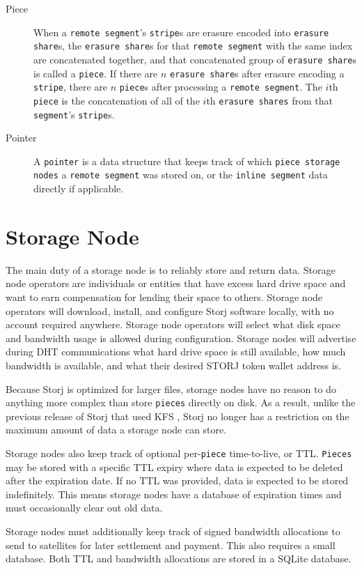 \documentclass[11pt,fleqn,openany]{book}
\newcommand{\x}[1]{{\tt #1}} \newcommand{\code}[1]{{\tt #1}}
\begin{document}
\begin{description}
\item[Piece] When a \x{remote segment}'s \x{stripe}s are erasure encoded into
\x{erasure share}s, the \x{erasure share}s for that \x{remote segment} with the
same index are concatenated together, and that concatenated group of \x{erasure
share}s is called a \x{piece}. If there are $n$ \x{erasure share}s after erasure
encoding a \x{stripe}, there are $n$ \x{piece}s after processing a \x{remote
segment}. The $i$th \x{piece} is the concatenation of all of the $i$th
\x{erasure shares} from that \x{segment}'s \x{stripe}s.

\item[Pointer] A \x{pointer} is a data structure that keeps track of which
\x{piece storage nodes} a \x{remote segment} was stored on, or the \x{inline
segment} data directly if applicable.
\end{description}

\section{Storage Node}

The main duty of a storage node is to reliably store and return data.
Storage node operators
are individuals or entities that have excess hard drive space and want to earn
compensation for lending their space to others. Storage node operators will
download,
install, and configure Storj software locally, with no account required
anywhere. Storage node operators will select what disk space and bandwidth usage
is allowed during configuration.
Storage nodes will advertise during DHT communications what hard drive space is
still
available, how much bandwidth is available, and what their desired STORJ token
wallet address is.

Because Storj is optimized for larger files, storage nodes have no reason to do
anything more complex than store \x{pieces} directly on disk. As a result,
unlike the previous release of Storj that used KFS \cite{storj-v2}, Storj no
longer has a restriction on the maximum amount of data a storage node can store.

Storage nodes also keep track of optional per-\x{piece} time-to-live, or TTL.
\x{Pieces} may be stored with a specific TTL expiry where data is expected to
be deleted after the expiration date. If no TTL was provided, data is expected
to be stored indefinitely. This means storage nodes have a database of
expiration
times and must occasionally clear out old data.

Storage nodes must additionally keep track of signed bandwidth allocations to
send to
satellites for later settlement and payment. This also requires a small
database. Both TTL and bandwidth allocations are stored in a SQLite
\cite{sqlite} database.
\end{document}
